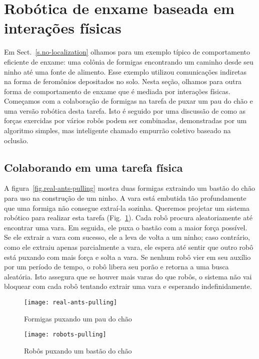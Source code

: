 \section{Robótica de enxame baseada em interações físicas}\label{s.swarm-physical}

Em Sect.~\ref{s.no-localization} olhamos para um exemplo típico de comportamento eficiente de enxame: uma colônia de formigas encontrando um caminho desde seu ninho até uma fonte de alimento. Esse exemplo utilizou comunicações indiretas na forma de feromônios depositados no solo. Nesta seção, olhamos para outra forma de comportamento de enxame que é mediada por interações físicas. Começamos com a colaboração de formigas na tarefa de puxar um pau do chão e uma versão robótica desta tarefa. Isto é seguido por uma discussão de como as forças exercidas por vários robôs podem ser combinadas, demonstradas por um algoritmo simples, mas inteligente chamado empurrão coletivo baseado na oclusão.

\subsection{Colaborando em uma tarefa física}

A figura~\ref{fig.real-ants-pulling} mostra duas formigas extraindo um bastão do chão para uso na construção de um ninho. A vara está embutida tão profundamente que uma formiga não consegue extraí-la sozinha. Queremos projetar um sistema robótico para realizar esta tarefa (Fig.~\ref{fig.robots-pulling}). Cada robô procura aleatoriamente até encontrar uma vara. Em seguida, ele puxa o bastão com a maior força possível. Se ele extrair a vara com sucesso, ele a leva de volta a um ninho; caso contrário, como ele extraiu apenas parcialmente a vara, ele espera até sentir que outro robô está puxando com mais força e solta a vara. Se nenhum robô vier em seu auxílio por um período de tempo, o robô libera seu porão e retorna a uma busca aleatória. Isto assegura que se houver mais varas do que robôs, o sistema não vai bloquear com cada robô tentando extrair uma vara e esperando indefinidamente.
\begin{figure}
\begin{minipage}{.45\textwidth}
\texttt{[image: real-ants-pulling]}
\caption{Formigas puxando um pau do chão}
\label{fig.real-ants-pulling}
\end{minipage}
\hspace{\fill}
\begin{minipage}{.45\textwidth}
\texttt{[image: robots-pulling]}
\caption{Robôs puxando um bastão do chão}
\label{fig.robots-pulling}
\end{minipage}
\end{figure}


